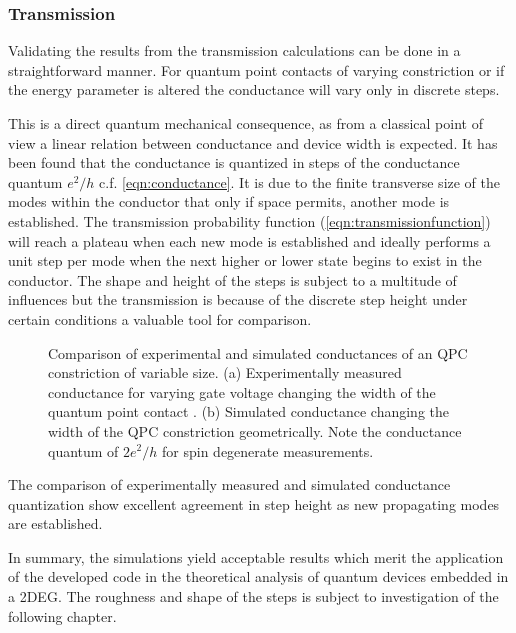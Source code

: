 \subsubsection{Transmission}
Validating the results from the transmission calculations can be done in a straightforward manner. For quantum point contacts of varying constriction or if the energy parameter is altered the conductance will vary only in discrete steps.\par
This is a direct quantum mechanical consequence, as from a classical point of view a linear relation between conductance and device width is expected.
It has been found that the conductance is quantized in steps of the conductance quantum $e^2/h$ c.f. \cref{eqn:conductance}.
It is due to the finite transverse size of the modes within the conductor that only if space permits, another mode is established. The transmission probability function (\cref{eqn:transmissionfunction}) will reach a plateau when each new mode is established and ideally performs a unit step per mode when the next higher or lower state begins to exist in the conductor. The shape and height of the steps is subject to a multitude of influences but the transmission is because of the discrete step height under certain conditions a valuable tool for comparison.\par
\begin{figure}[h]
  \begin{center}
    \caption{Comparison of experimental and simulated conductances of an QPC constriction of variable size. (a) Experimentally measured conductance for varying gate voltage changing the width of the quantum point contact \cite{PhysRevLett.60.848}. (b) Simulated conductance changing the width of the QPC constriction geometrically. Note the conductance quantum of $2e^2/h$ for spin degenerate measurements.}
\end{center}
\end{figure}
The comparison of experimentally measured and simulated conductance quantization show excellent agreement in step height as new propagating modes are established.\par
In summary, the simulations yield acceptable results which merit the application of the developed code in the theoretical analysis of quantum devices embedded in a 2DEG.
The roughness and shape of the steps is subject to investigation of the following chapter.\par
\FloatBarrier
